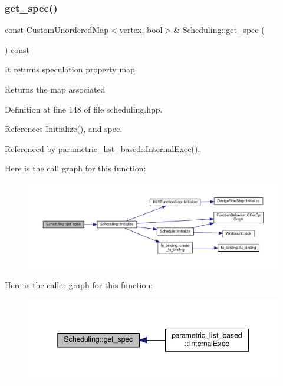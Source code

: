 \subsubsection{\texorpdfstring{get\+\_\+spec()}{get\_spec()}}
{\footnotesize\ttfamily const \hyperlink{custom__map_8hpp_ad1ed68f2ff093683ab1a33522b144adc}{Custom\+Unordered\+Map}$<$\hyperlink{graph_8hpp_abefdcf0544e601805af44eca032cca14}{vertex}, bool$>$\& Scheduling\+::get\+\_\+spec (\begin{DoxyParamCaption}{ }\end{DoxyParamCaption}) const\hspace{0.3cm}{\ttfamily [inline]}}



It returns speculation property map. 

\begin{DoxyReturn}{Returns}
the map associated 
\end{DoxyReturn}


Definition at line 148 of file scheduling.\+hpp.



References Initialize(), and spec.



Referenced by parametric\+\_\+list\+\_\+based\+::\+Internal\+Exec().

Here is the call graph for this function\+:
\nopagebreak
\begin{figure}[H]
\begin{center}
\leavevmode
\includegraphics[width=350pt]{db/d2c/classScheduling_ada5eff4553c39bf5f6c58e75c86a130b_cgraph}
\end{center}
\end{figure}
Here is the caller graph for this function\+:
\nopagebreak
\begin{figure}[H]
\begin{center}
\leavevmode
\includegraphics[width=338pt]{db/d2c/classScheduling_ada5eff4553c39bf5f6c58e75c86a130b_icgraph}
\end{center}
\end{figure}
\mbox{\label{classScheduling_a5e00e09071613f56a5542b3c3636b71e}} 
